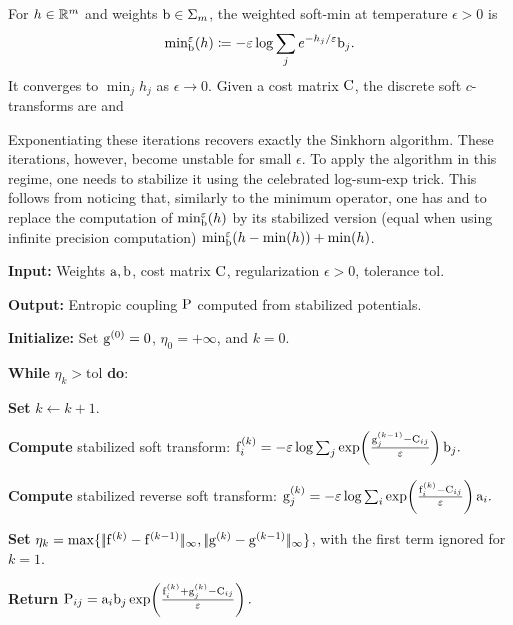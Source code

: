 \begin{defn}\label{def-discrete-soft-c-transform}
		For $h\in\RR^m$ and weights $\b\in\simplex_m$, the weighted soft-min at temperature $\epsilon>0$ is
		\[
			{\min}_{\b}^\epsilon(h) \eqdef -\epsilon \log \sum_j e^{-h_j/\epsilon} \b_j.
		\]
		It converges to $\min_j h_j$ as $\epsilon\to0$. Given a cost matrix $\C$, the discrete soft $c$-transforms are
	and
\end{defn}
Exponentiating these iterations recovers exactly the Sinkhorn algorithm. These iterations, however, become unstable for small $\epsilon$. To apply the algorithm in this regime, one needs to stabilize it using the celebrated log-sum-exp trick. This follows from noticing that, similarly to the minimum operator, one has
and to replace the computation of ${\min}_{\b}^\epsilon(h)$ by its stabilized version (equal when using infinite precision computation) ${\min}_{\b}^\epsilon(h-\min(h)) + \min(h)$.

\begin{alg}\label{alg:log-domain-sinkhorn}
\textbf{Input:} Weights $\a,\b$, cost matrix $\C$, regularization $\epsilon>0$, tolerance $\mathrm{tol}$.

\textbf{Output:} Entropic coupling $\P$ computed from stabilized potentials.

\textbf{Initialize:} Set $\gD^{(0)}=0$, \(\eta_0=+\infty\), and \(k=0\).

\textbf{While} \(\eta_k>\mathrm{tol}\) \textbf{do}:
\begin{algblock}

\textbf{Set} \(k\leftarrow k+1\).

\textbf{Compute} stabilized soft transform:
\(\fD_i^{(k)} = -\epsilon\log\sum_j \exp\!\left(\frac{\gD_j^{(k-1)}-\C_{ij}}{\epsilon}\right)\b_j.\)

\textbf{Compute} stabilized reverse soft transform:
\(\gD_j^{(k)} = -\epsilon\log\sum_i \exp\!\left(\frac{\fD_i^{(k)}-\C_{ij}}{\epsilon}\right)\a_i.\)

\textbf{Set} \(\eta_k=\max\{\norm{\fD^{(k)}-\fD^{(k-1)}}_\infty,\norm{\gD^{(k)}-\gD^{(k-1)}}_\infty\}\), with the first term ignored for \(k=1\).
\end{algblock}
\algreturnskip
\textbf{Return} \(\P_{ij} = \a_i\b_j \exp\!\left(\frac{\fD_i^{(k)}+\gD_j^{(k)}-\C_{ij}}{\epsilon}\right).\)
\end{alg}

